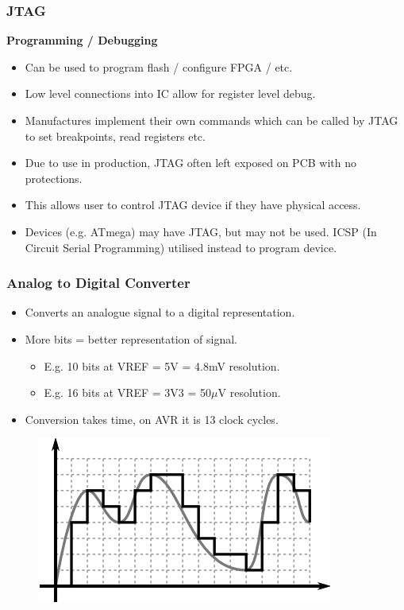 \documentclass[t]{beamer}
\begin{document}

\begin{frame}[t]
\frametitle{JTAG}
\textbf{Programming / Debugging}
\begin{itemize}
	\item Can be used to program flash / configure FPGA / etc.
	\item Low level connections into IC allow for register level debug.
	\item Manufactures implement their own commands which can be called by JTAG to set breakpoints, read registers etc.
	\item Due to use in production, JTAG often left exposed on PCB with no protections. 
	\item This allows user to control JTAG device if they have physical access. 
	\item Devices (e.g. ATmega) may have JTAG, but may not be used. ICSP (In Circuit Serial Programming) utilised instead to program device. 
\end{itemize}

\end{frame}


\begin{frame}[t]
\frametitle{Analog to Digital Converter}
\begin{itemize}
	\item Converts an analogue signal to a digital representation. 
	\item More bits = better representation of signal. 
	\begin{itemize}
		\item E.g. 10 bits at VREF = 5V = 4.8mV resolution.
		\item E.g. 16 bits at VREF = 3V3 = 50$\mu$V resolution. 
	\end{itemize}
	\item Conversion takes time, on AVR it is 13 clock cycles. 
\end{itemize}

\begin{figure}
	\includegraphics[width=0.6\linewidth]{analogVSdigital.png}
\end{figure}
\end{frame}
\end{document}
